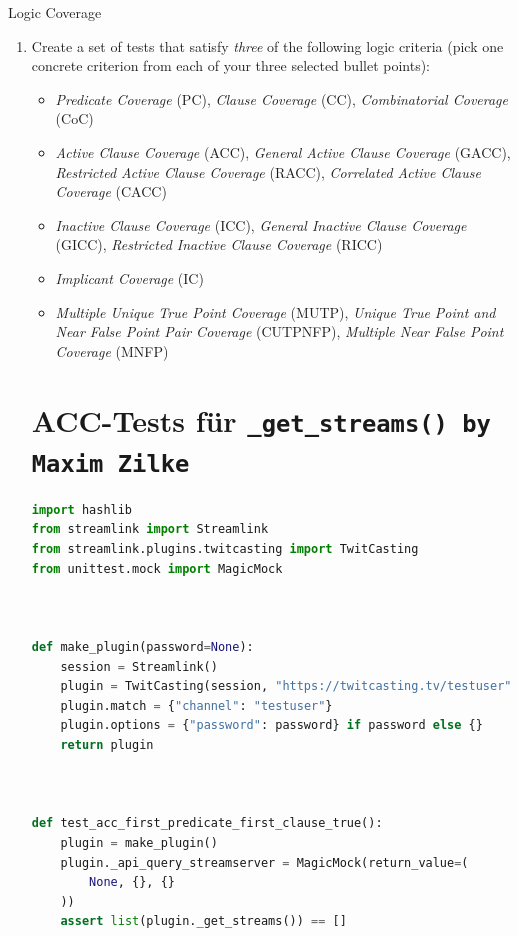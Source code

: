 \documentclass[a4paper]{scrreprt}
\newcounter{question}
\begin{document}
\begin{question}{Logic Coverage}
\begin{enumerate}[topsep=0pt, leftmargin=*]
    \item Create a set of tests that satisfy \textit{three} of the following logic criteria (pick one concrete criterion from each of your three selected bullet points):
          \begin{itemize}
            \item \textit{Predicate Coverage} (PC), \textit{Clause Coverage} (CC), \textit{Combinatorial Coverage} (CoC)
            \item \textit{Active Clause Coverage} (ACC), \textit{General Active Clause Coverage} (GACC), \textit{Restricted Active Clause Coverage} (RACC), \textit{Correlated Active Clause Coverage} (CACC)
            \item \textit{Inactive Clause Coverage} (ICC), \textit{General Inactive Clause Coverage} (GICC), \textit{Restricted Inactive Clause Coverage} (RICC)
            \item \textit{Implicant Coverage} (IC)
            \item \textit{Multiple Unique True Point Coverage} (MUTP), \textit{Unique True Point and Near False Point Pair Coverage} (CUTPNFP), \textit{Multiple Near False Point Coverage} (MNFP)
          \end{itemize}
          \begin{answer}
\section*{ACC-Tests für \texttt{\_get\_streams() by Maxim Zilke}}
\begin{lstlisting}[language=Python]
import hashlib
from streamlink import Streamlink
from streamlink.plugins.twitcasting import TwitCasting
from unittest.mock import MagicMock



def make_plugin(password=None):
    session = Streamlink()
    plugin = TwitCasting(session, "https://twitcasting.tv/testuser")
    plugin.match = {"channel": "testuser"}
    plugin.options = {"password": password} if password else {}
    return plugin



def test_acc_first_predicate_first_clause_true():
    plugin = make_plugin()
    plugin._api_query_streamserver = MagicMock(return_value=(
        None, {}, {}
    ))
    assert list(plugin._get_streams()) == []




\end{lstlisting}
\end{answer}
\end{enumerate}
\end{question}
\end{document}
